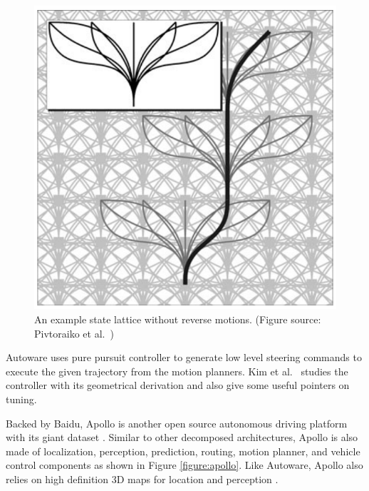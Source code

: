 \begin{figure}[h]
  \centering
  \includegraphics[width=.8\textwidth]{figures/state-lattice.png}
  \caption[An example state lattice]{An example state lattice without reverse
    motions. (Figure source: Pivtoraiko et al.\
    \cite{Pivtoraiko2009DifferentiallyCM})}
  \label{figure:state-lattice}
\end{figure}

Autoware uses pure pursuit controller to generate low level steering commands
to execute the given trajectory from the motion planners. Kim et al.\
\cite{Kim2013SensorbasedMP} studies the controller with its geometrical
derivation and also give some useful pointers on tuning.

Backed by Baidu, Apollo is another open source autonomous driving platform with
its giant dataset \cite{Huang2018TheAD}. Similar to other decomposed
architectures, Apollo is also made of localization, perception, prediction,
routing, motion planner, and vehicle control components as shown in Figure
\ref{figure:apollo}. Like Autoware, Apollo also relies on high definition 3D
maps for location and perception \cite{Fan2018BaiduAE}.

